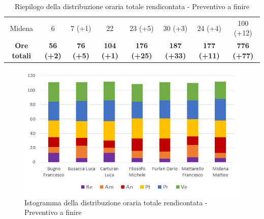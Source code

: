 \begin{table}[H]
\begin{tabular}{c|c|c|c|c|c|c|c}
    Midena              & 6                                                             & 7 (+1)           & 22                & 23 (+5)            & 30 (+3)            & 24 (+4)            & 100 (+12)          \\
    \textbf{Ore totali} & \textbf{56 (+2)}                                              & \textbf{76 (+5)} & \textbf{104 (+1)} & \textbf{176 (+25)} & \textbf{187 (+33)} & \textbf{177 (+11)} & \textbf{776 (+77)}
  \end{tabular}
  \caption{Riepilogo della distribuzione oraria totale rendicontata - Preventivo a finire}
\end{table}

\begin{figure}[H]
  \centering
  \includegraphics[scale=0.9]{immagini/ore_lavoro_preventivo_finire_PB.png}
  \caption{Istogramma della distribuzione oraria totale rendicontata - Preventivo a finire}
\end{figure}



